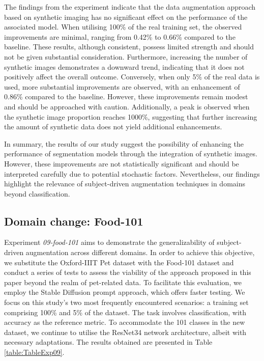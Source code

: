 The findings from the experiment indicate that the data augmentation approach based on synthetic imaging has no significant effect on the performance of the associated model. When utilising 100\% of the real training set, the observed improvements are minimal, ranging from 0.42\% to 0.66\% compared to the baseline. These results, although consistent, possess limited strength and should not be given substantial consideration. Furthermore, increasing the number of synthetic images demonstrates a downward trend, indicating that it does not positively affect the overall outcome. Conversely, when only 5\% of the real data is used, more substantial improvements are observed, with an enhancement of 0.86\% compared to the baseline. However, these improvements remain modest and should be approached with caution. Additionally, a peak is observed when the synthetic image proportion reaches 1000\%, suggesting that further increasing the amount of synthetic data does not yield additional enhancements.

In summary, the results of our study suggest the possibility of enhancing the performance of segmentation models through the integration of synthetic images. However, these improvements are not statistically significant and should be interpreted carefully due to potential stochastic factors. Nevertheless, our findings highlight the relevance of subject-driven augmentation techniques in domains beyond classification.

\subsection{Domain change: Food-101} \label{sec: exp-09}

Experiment \textit{09-food-101} aims to demonstrate the generalizability of subject-driven augmentation across different domains. In order to achieve this objective, we substitute the Oxford-IIIT Pet dataset with the Food-101 dataset and conduct a series of tests to assess the viability of the approach proposed in this paper beyond the realm of pet-related data. To facilitate this evaluation, we employ the Stable Diffusion prompt approach, which offers faster testing. We focus on this study's two most frequently encountered scenarios: a training set comprising 100\% and 5\% of the dataset. The task involves classification, with accuracy as the reference metric. To accommodate the 101 classes in the new dataset, we continue to utilise the ResNet34 network architecture, albeit with necessary adaptations. The results obtained are presented in Table \ref{table:TableExp09}.

